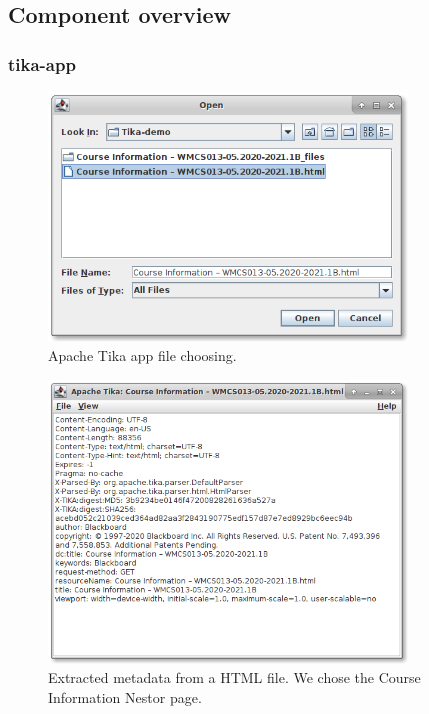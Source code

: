 \documentclass{article}
\begin{document}
\subsection{Component overview}
\subsubsection{tika-app}
\begin{figure}[ht]
    \centering
    \includegraphics[width=0.85\textwidth]{report/images/tika_app/filechooser.png}
    \caption{Apache Tika app file choosing.}
    \label{fig:tika_app/filechooser}
\end{figure}
\begin{figure}[ht]
    \centering
    \includegraphics[width=0.85\textwidth]{report/images/tika_app/metadata.png}
    \caption{Extracted metadata from a HTML file. We chose the Course Information Nestor page.}
    \label{fig:tika_app/metadata}
\end{figure}
\end{document}

